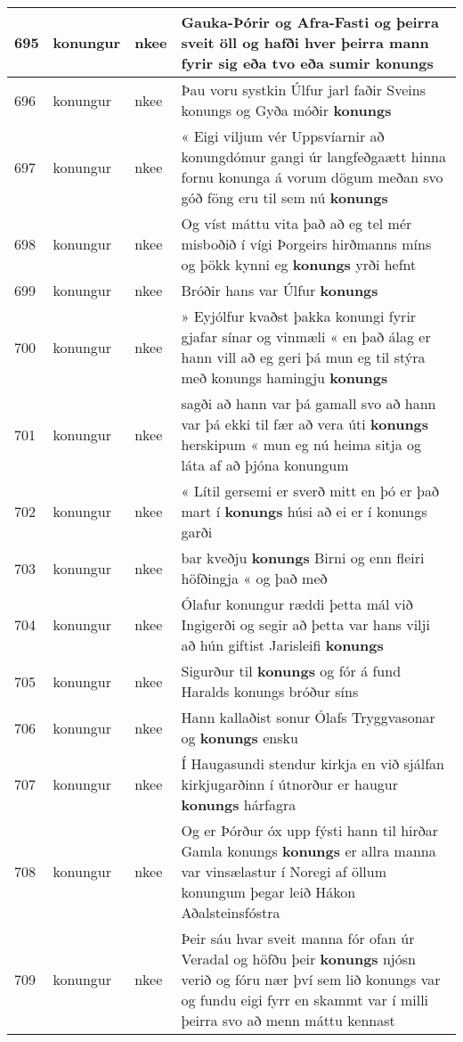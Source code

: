 \documentclass{article}
\begin{document}
\begin{longtable}{p{1cm}|p{1cm}|p{1cm}|p{13cm}}
\hline
695&konungur&nkee&Gauka-Þórir og Afra-Fasti og þeirra sveit öll og hafði hver þeirra mann fyrir sig eða tvo eða sumir \textbf{konungs} \\
\hline
696&konungur&nkee&Þau voru systkin Úlfur jarl faðir Sveins konungs og Gyða móðir \textbf{konungs} \\
\hline
697&konungur&nkee&« Eigi viljum vér Uppsvíarnir að konungdómur gangi úr langfeðgaætt hinna fornu konunga á vorum dögum meðan svo góð föng eru til sem nú \textbf{konungs} \\
\hline
698&konungur&nkee&Og víst máttu vita það að eg tel mér misboðið í vígi Þorgeirs hirðmanns míns og þökk kynni eg \textbf{konungs} yrði hefnt\\
\hline
699&konungur&nkee&Bróðir hans var Úlfur \textbf{konungs} \\
\hline
700&konungur&nkee&» Eyjólfur kvaðst þakka konungi fyrir gjafar sínar og vinmæli « en það álag er hann vill að eg geri þá mun eg til stýra með konungs hamingju \textbf{konungs} \\
\hline
701&konungur&nkee&sagði að hann var þá gamall svo að hann var þá ekki til fær að vera úti \textbf{konungs} herskipum « mun eg nú heima sitja og láta af að þjóna konungum\\
\hline
702&konungur&nkee&« Lítil gersemi er sverð mitt en þó er það mart í \textbf{konungs} húsi að ei er í konungs garði\\
\hline
703&konungur&nkee&bar kveðju \textbf{konungs} Birni og enn fleiri höfðingja « og það með\\
\hline
704&konungur&nkee&Ólafur konungur ræddi þetta mál við Ingigerði og segir að þetta var hans vilji að hún giftist Jarisleifi \textbf{konungs} \\
\hline
705&konungur&nkee&Sigurður til \textbf{konungs} og fór á fund Haralds konungs bróður síns\\
\hline
706&konungur&nkee&Hann kallaðist sonur Ólafs Tryggvasonar og \textbf{konungs} ensku\\
\hline
707&konungur&nkee&Í Haugasundi stendur kirkja en við sjálfan kirkjugarðinn í útnorður er haugur \textbf{konungs} hárfagra\\
\hline
708&konungur&nkee&Og er Þórður óx upp fýsti hann til hirðar Gamla konungs \textbf{konungs} er allra manna var vinsælastur í Noregi af öllum konungum þegar leið Hákon Aðalsteinsfóstra\\
\hline
709&konungur&nkee&Þeir sáu hvar sveit manna fór ofan úr Veradal og höfðu þeir \textbf{konungs} njósn verið og fóru nær því sem lið konungs var og fundu eigi fyrr en skammt var í milli þeirra svo að menn máttu kennast\\

\end{longtable}
\end{document}
